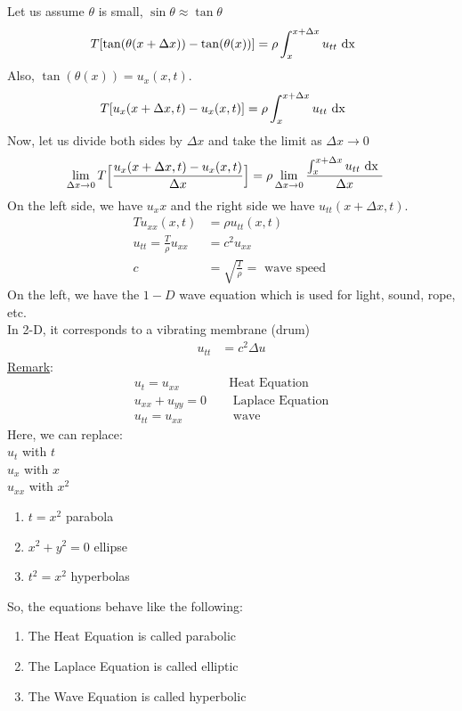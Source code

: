 Let us assume $\theta$ is small, $\sin \theta \approx \tan \theta$
\begin{align}
  T[\tan(\theta(x + \Delta x)) - \tan(\theta(x))] & = \rho \int^{x + \Delta x}_x u_{tt} \text{ dx }
\end{align}
Also, $\tan(\theta(x)) = u_x(x, t)$.
\begin{align}
  T[u_x(x + \Delta x, t) - u_x(x, t)] & =
  \rho \int^{x + \Delta x}_x u_{tt} \text{ dx }
\end{align}
Now, let us divide both sides by $\Delta x$ and take the limit as $\Delta x \rightarrow 0$
\begin{align}
  \lim_{\Delta x \rightarrow 0} T\Big[\frac{u_x(x + \Delta x, t) - u_x(x, t)}{\Delta x}\Big] & =
  \rho \lim_{\Delta x \rightarrow 0} \frac{\int^{x + \Delta x}_x u_{tt} \text{ dx }}{\Delta x}
\end{align}
On the left side, we have $u_xx$ and the right side we have $u_{tt}(x + \Delta x, t)$.
\begin{align}
  Tu_{xx}(x, t) & = \rho u_{tt}(x, t)\\
  u_{tt} = \frac{T}{\rho} u_{xx} & = c^2 u_{xx}\\
  c & = \sqrt{\frac{T}{\rho}} = \text{ wave speed }
\end{align}
On the left, we have the $1-D$ wave equation which is used for light, sound, rope, etc.\\
In 2-D, it corresponds to a vibrating membrane (drum)
\begin{align}
  u_{tt} & = c^2\Delta u
\end{align}
\underline{Remark}:
\begin{align}
  u_t = u_{xx} \quad & \text{Heat Equation}\\
  u_{xx} + u_{yy} = 0 \quad & \text{ Laplace Equation}\\
  u_{tt} = u_{xx} \quad & \text{ wave}
\end{align}
Here, we can replace:\\
$u_t$ with $t$\\
$u_x$ with $x$\\
$u_{xx}$ with $x^2$
\begin{enumerate}
  \item $t = x^2$ parabola
  \item $x^2 + y^2 = 0$ ellipse
  \item $t^2 = x^2$ hyperbolas
\end{enumerate}
So, the equations behave like the following:
\begin{enumerate}
  \item The Heat Equation is called parabolic
  \item The Laplace Equation is called elliptic
  \item The Wave Equation is called hyperbolic
\end{enumerate}
\newpage

